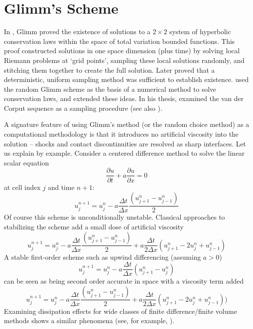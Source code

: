 \section{Glimm\rq{}s Scheme}
In \citep{glimm1965solutions}, Glimm proved the existence  of solutions to a  $2\times2$ 
system of hyperbolic conservation laws within the space of total variation bounded functions. 
This proof constructed solutions in one space dimension (plus time) by solving local Riemann problems at `grid points\rq{}, sampling these local solutions randomly, and stitching them together to create the full solution.  Later \citet{liu1977deterministic} proved that a deterministic, uniform sampling 
method was sufficient to establish existence. \citet{chorin1976random} used
the random Glimm scheme as the basis of a numerical method to solve conservation laws, and
\citet{concus1979numerical} extended these ideas.
In his thesis, \citet{colella1978analysis} examined the van der Corput sequence as a sampling procedure (see also \citep{colella1982glimm}).

A signature feature of using Glimm\rq{}s method (or the random choice method) as a computational methodology is that
it introduces no artificial viscosity into the solution -- shocks and contact discontinuities are
resolved as sharp interfaces.  Let us explain by example. Consider a centered difference
method to solve the linear scalar equation 
\begin{equation}
\label{linear}
\frac{\partial u}{\partial t }+ a \frac{\partial u}{\partial x} = 0
\end{equation}
at cell index $j$ and time $n+1$:
\begin{equation}
u_j^{n+1} = u_j^n - a \frac{\Delta t}{\Delta x} \frac{(u_{j+1}^n - u_{j-1}^n)}{2}
\end{equation}
Of course this scheme is unconditionally unstable. Classical approaches to stabilizing the scheme add a small dose of artificial viscosity
\begin{equation}
u_j^{n+1} = u_j^n - a \frac{\Delta t}{\Delta x} \frac{(u_{j+1}^n - u_{j-1}^n)}{2} + a \frac{\Delta t}{2 \Delta x} (u_{j+1}^n -2 u_j^n + u_{j-1}^n)
\end{equation}
A stable first-order scheme such as upwind differencing (assuming $a>0$)
\begin{equation}
u_j^{n+1} = u_j^n - a \frac{\Delta t}{\Delta x} {(u_{j+1}^n - u_{j}^n)}
\end{equation}
can be seen as being second order accurate in space with a viscosity term added
\begin{equation}
u_j^{n+1} = u_j^n - a \frac{\Delta t}{\Delta x} \frac{(u_{j+1}^n - u_{j-1}^n)}{2} + a \frac{\Delta t}{2 \Delta x} (u_{j+1}^n -2 u_j^n + u_{j-1}^n))
\end{equation}
Examining dissipation effects for wide classes of finite difference/finite volume methods 
shows a similar phenomena (see, for example, \citep{warming1974modified}).

